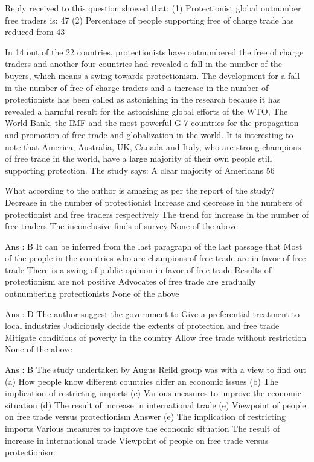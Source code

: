 Reply received to this question showed that:
(1) Protectionist global outnumber free traders is: 47%
(2) Percentage of people supporting free of charge trade has reduced from 43%

In 14 out of the 22 countries, protectionists have outnumbered the free of charge traders and another four countries had revealed a fall in the number of the buyers, which means a swing towards protectionism. The development for a fall in the number of free of charge traders and a increase in the number of protectionists has been called as astonishing in the research because it has revealed a harmful result for the astonishing global efforts of the WTO, The World Bank, the IMF and the most powerful G-7 countries for the propagation and promotion of free trade and globalization in the world. It is interesting to note that America, Australia, UK, Canada and Italy, who are strong champions of free trade in the world, have a large majority of their own people still supporting protection. The study says: A clear majority of Americans 56%

    What according to the author is amazing as per the report of the study?
        Decrease in the number of protectionist
        Increase and decrease in the numbers of protectionist and free traders respectively
        The trend for increase in the number of free traders
        The inconclusive finds of survey
        None of the above 

    Ans : B
    It can be inferred from the last paragraph of the last passage that
        Most of the people in the countries who are champions of free trade are in favor of free trade
        There is a swing of public opinion in favor of free trade
        Results of protectionism are not positive
        Advocates of free trade are gradually outnumbering protectionists
        None of the above 

    Ans : D
    The author suggest the government to
        Give a preferential treatment to local industries
        Judiciously decide the extents of protection and free trade
        Mitigate conditions of poverty in the country
        Allow free trade without restriction
        None of the above 

    Ans : B
    The study undertaken by Augus Reild group was with a view to find out
        (a) How people know different countries differ an economic issues (b) The implication of restricting imports (c) Various measures to improve the economic situation (d) The result of increase in international trade (e) Viewpoint of people on free trade versus protectionism Answer (e)
        The implication of restricting imports
        Various measures to improve the economic situation
        The result of increase in international trade
        Viewpoint of people on free trade versus protectionism 

